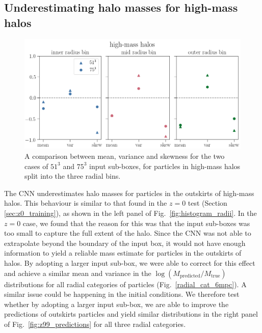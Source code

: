 \documentclass[11pt]{article}
\begin{document}
\subsection{Underestimating halo masses for high-mass halos}
\begin{figure}
\centering
\includegraphics[width=\columnwidth]{z99/high_mass_comparison.png}
\caption{A comparison between mean, variance and skewness for the two cases of $51^3$ and  $75^3$ input sub-boxes, for particles in high-mass halos split into the three radial bins.}
\label{fig:high_mass_pred}
\end{figure}

The CNN underestimates halo masses for particles in the outskirts of high-mass halos. This behaviour is similar to that found in the $z=0$ test (Section \ref{sec:z0_training}), as shown in the left panel of Fig.~\ref{fig:histogram_radii}. In the $z=0$ case, we found that the reason for this was that the input sub-boxes was too small to capture the full extent of the halo. Since the CNN was not able to extrapolate beyond the boundary of the input box, it would not have enough information to yield a reliable mass estimate for particles in the outskirts of halos. By adopting a larger input sub-box, we were able to correct for this effect and achieve a similar mean and variance in the $\log(M_\mathrm{predicted}/M_\mathrm{true})$ distributions for all radial categories of particles (Fig.~\ref{radial_cat_6mpc}). A similar issue could be happening in the initial conditions. We therefore test whether by adopting a larger input sub-box, we are able to improve the predictions of outskirts particles and yield similar distributions in the right panel of Fig.~\ref{fig:z99_predictions} for all three radial categories.
\end{document}
